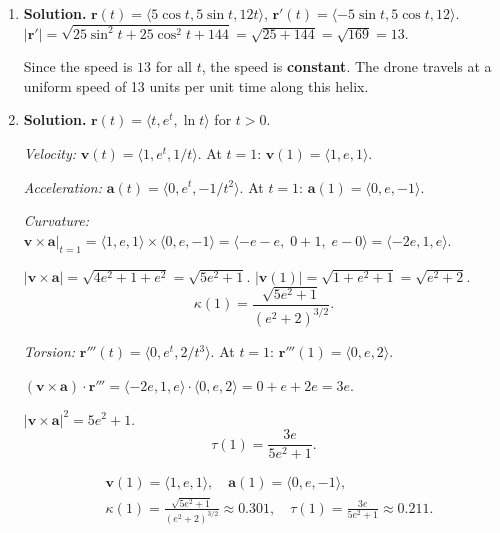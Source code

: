 \begin{enumerate}
\[
\boxed{L=2\pi\sqrt{25+4\pi^2}+25\ln\!\left(\frac{2\pi+\sqrt{25+4\pi^2}}{5}\right)\approx 66.89.}
\]

\item \textbf{Solution.}
$\mathbf{r}(t)=\langle 5\cos t, 5\sin t, 12t\rangle$, $\mathbf{r}'(t)=\langle -5\sin t, 5\cos t, 12\rangle$.
$|\mathbf{r}'|=\sqrt{25\sin^2 t+25\cos^2 t+144}=\sqrt{25+144}=\sqrt{169}=13$.

Since the speed is $\boxed{13}$ for all $t$, the speed is \textbf{constant}. The drone travels at a uniform speed of 13 units per unit time along this helix.

\item \textbf{Solution.}
$\mathbf{r}(t)=\langle t, e^t, \ln t\rangle$ for $t>0$.

\textit{Velocity:} $\mathbf{v}(t)=\langle 1, e^t, 1/t\rangle$. At $t=1$: $\mathbf{v}(1)=\langle 1, e, 1\rangle$.

\textit{Acceleration:} $\mathbf{a}(t)=\langle 0, e^t, -1/t^2\rangle$. At $t=1$: $\mathbf{a}(1)=\langle 0, e, -1\rangle$.

\textit{Curvature:}
$\mathbf{v}\times\mathbf{a}|_{t=1}=\langle 1,e,1\rangle\times\langle 0,e,-1\rangle = \langle -e-e,\; 0+1,\; e-0\rangle = \langle -2e, 1, e\rangle$.

$|\mathbf{v}\times\mathbf{a}|=\sqrt{4e^2+1+e^2}=\sqrt{5e^2+1}$.
$|\mathbf{v}(1)|=\sqrt{1+e^2+1}=\sqrt{e^2+2}$.
\[
\kappa(1)=\frac{\sqrt{5e^2+1}}{(e^2+2)^{3/2}}.
\]

\textit{Torsion:}
$\mathbf{r}'''(t)=\langle 0, e^t, 2/t^3\rangle$. At $t=1$: $\mathbf{r}'''(1)=\langle 0, e, 2\rangle$.

$(\mathbf{v}\times\mathbf{a})\cdot\mathbf{r}'''=\langle -2e,1,e\rangle\cdot\langle 0,e,2\rangle = 0+e+2e = 3e$.

$|\mathbf{v}\times\mathbf{a}|^2=5e^2+1$.
\[
\tau(1)=\frac{3e}{5e^2+1}.
\]

\begin{align*}
&\boxed{\mathbf{v}(1)=\langle 1,e,1\rangle,\quad \mathbf{a}(1)=\langle 0,e,-1\rangle,} \\
&\boxed{\kappa(1)=\frac{\sqrt{5e^2+1}}{(e^2+2)^{3/2}}\approx 0.301,\quad \tau(1)=\frac{3e}{5e^2+1}\approx 0.211.}
\end{align*}

\end{enumerate}
